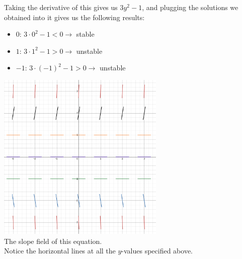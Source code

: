 \documentclass[12pt]{article}
\begin{document}
\begin{enumerate}
    Taking the derivative of this gives us $3y^2-1$, and plugging the solutions we obtained into it gives us the following results:
    \begin{itemize}
        \item $0$: $3 \cdot 0^2-1<0 \rightarrow$ stable
        \item $1$: $3 \cdot 1^2-1>0 \rightarrow$ unstable
        \item $-1$: $3 \cdot (-1)^2-1>0 \rightarrow$ unstable
    \end{itemize}
    \begin{center}
        \includegraphics[width=8cm]{img/slope_field} \\
        \small{The slope field of this equation. \\ Notice the horizontal lines at all the $y$-values specified above.}
    \end{center}
\end{enumerate}
\end{document}

